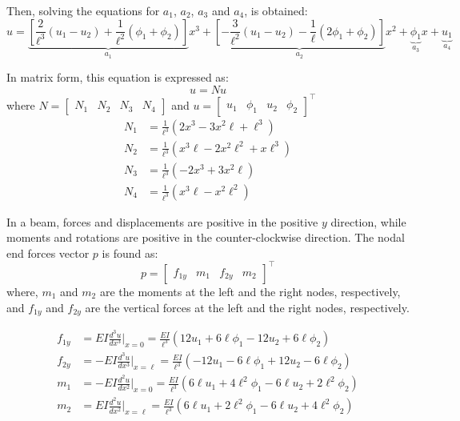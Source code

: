 Then, solving the equations for $a_1$, $a_2$, $a_3$ and $a_4$, is obtained:
%
\begin{equation}
    u = \underbrace{
\left[ \frac{2}{\ell^3}(u_1 - u_2) + \frac{1}{\ell^2}(\phi_1 + \phi_2)\right]}_{a_1} x^3 + 
    \underbrace{\left[ -\frac{3}{\ell^2}(u_1 - u_2) - \frac{1}{\ell}(2\phi_1 + \phi_2)\right]}_{a_2} x^2 + \underbrace{\phi_1}_{a_3}x  + \underbrace{u_1}_{a_4}
\end{equation}

In matrix form, this equation is expressed as:
%
\begin{equation}
    u = N u
\end{equation}
%
where $N = \begin{bmatrix} N_1 & N_2 & N_3 & N_4 \end{bmatrix}$ and $u = \begin{bmatrix} u_1 & \phi_1 & u_2 & \phi_2 \end{bmatrix}^\intercal$
%
\begin{align}
 N_1 &= \frac{1}{\ell^3}\left( 2x^3 - 3x^2\ell + \ell^3\right)\\
 N_2 &= \frac{1}{\ell^3}\left( x^3\ell - 
2x^2\ell^2 + x\ell^3\right)\\
 N_3 &= \frac{1}{\ell^3}\left( -2x^3 + 3 x^2\ell\right)\\
 N_4 &= \frac{1}{\ell^3}\left( x^3\ell - 
x^2\ell^2\right)
\end{align}

In a beam, forces and displacements are positive in the positive $y$ direction, while moments and rotations are positive in the counter-clockwise direction. The nodal end forces vector $p$ is found as:
%
\begin{equation}
    p = \begin{bmatrix} f_{1y} & m_1 & f_{2y} & m_2 \end{bmatrix}^\intercal
\end{equation}
%
where, $m_1$ and $m_2$ are the moments at the left and the right nodes, respectively, and $f_{1y}$ and $f_{2y}$ are the vertical forces at the left and the right nodes, respectively. 

\begin{align}
 f_{1y} & = EI\frac{d^3u}{dx^3}\Big|_{x=0} = \frac{EI}{\ell^3}
 \left( 12u_1 + 6\ell\phi_1 - 12u_2 + 6 \ell\phi_2\right)\\
 f_{2y} & = -EI\frac{d^3u}{dx^3}\Big|_{x=\ell} = \frac{EI}{\ell^3}
 \left( -12u_1 - 6\ell\phi_1 + 12u_2 - 6 \ell\phi_2\right)\\
 m_1 &= -EI\frac{d^2u}{dx^2}\Big|_{x=0} = \frac{EI}{\ell^3}
 \left( 6\ell u_1 + 4 \ell^2\phi_1 - 6\ell u_2 + 2 \ell^2\phi_2\right)\\
 m_2 &= EI\frac{d^2u}{dx^2}\Big|_{x=\ell} = \frac{EI}{\ell^3}
 \left( 6\ell u_1 + 2 \ell^2\phi_1 - 6\ell u_2 + 4 \ell^2\phi_2\right)
\end{align}

